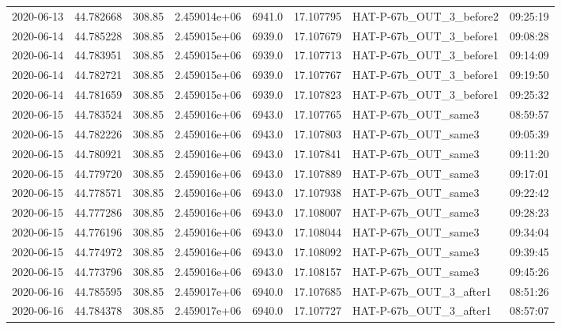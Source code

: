 \documentclass[modern]{aastex631}
\begin{document}
\begin{tabular}{lrrrlrll}
    2020-06-13 & 44.782668   & 308.85        & 2.459014e+06 & 6941.0 & 17.107795 & HAT-P-67b\_OUT\_3\_before2 & 09:25:19 \\
    2020-06-14 & 44.785228   & 308.85        & 2.459015e+06 & 6939.0 & 17.107679 & HAT-P-67b\_OUT\_3\_before1 & 09:08:28 \\
    2020-06-14 & 44.783951   & 308.85        & 2.459015e+06 & 6939.0 & 17.107713 & HAT-P-67b\_OUT\_3\_before1 & 09:14:09 \\
    2020-06-14 & 44.782721   & 308.85        & 2.459015e+06 & 6939.0 & 17.107767 & HAT-P-67b\_OUT\_3\_before1 & 09:19:50 \\
    2020-06-14 & 44.781659   & 308.85        & 2.459015e+06 & 6939.0 & 17.107823 & HAT-P-67b\_OUT\_3\_before1 & 09:25:32 \\
    2020-06-15 & 44.783524   & 308.85        & 2.459016e+06 & 6943.0 & 17.107765 & HAT-P-67b\_OUT\_same3      & 08:59:57 \\
    2020-06-15 & 44.782226   & 308.85        & 2.459016e+06 & 6943.0 & 17.107803 & HAT-P-67b\_OUT\_same3      & 09:05:39 \\
    2020-06-15 & 44.780921   & 308.85        & 2.459016e+06 & 6943.0 & 17.107841 & HAT-P-67b\_OUT\_same3      & 09:11:20 \\
    2020-06-15 & 44.779720   & 308.85        & 2.459016e+06 & 6943.0 & 17.107889 & HAT-P-67b\_OUT\_same3      & 09:17:01 \\
    2020-06-15 & 44.778571   & 308.85        & 2.459016e+06 & 6943.0 & 17.107938 & HAT-P-67b\_OUT\_same3      & 09:22:42 \\
    2020-06-15 & 44.777286   & 308.85        & 2.459016e+06 & 6943.0 & 17.108007 & HAT-P-67b\_OUT\_same3      & 09:28:23 \\
    2020-06-15 & 44.776196   & 308.85        & 2.459016e+06 & 6943.0 & 17.108044 & HAT-P-67b\_OUT\_same3      & 09:34:04 \\
    2020-06-15 & 44.774972   & 308.85        & 2.459016e+06 & 6943.0 & 17.108092 & HAT-P-67b\_OUT\_same3      & 09:39:45 \\
    2020-06-15 & 44.773796   & 308.85        & 2.459016e+06 & 6943.0 & 17.108157 & HAT-P-67b\_OUT\_same3      & 09:45:26 \\
    2020-06-16 & 44.785595   & 308.85        & 2.459017e+06 & 6940.0 & 17.107685 & HAT-P-67b\_OUT\_3\_after1  & 08:51:26 \\
    2020-06-16 & 44.784378   & 308.85        & 2.459017e+06 & 6940.0 & 17.107727 & HAT-P-67b\_OUT\_3\_after1  & 08:57:07 \\

\end{tabular}
\end{document}
